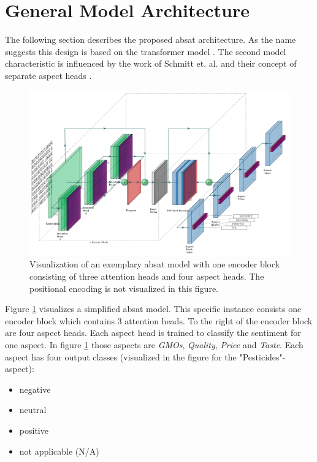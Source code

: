 \section{General Model Architecture}

The following section describes the proposed \acrfull{absat} architecture. As the name suggests this design is based on the transformer model \cite{Vaswani2017}. The second model characteristic is influenced by the work of Schmitt et. al. and their concept of separate aspect heads \cite{Schmitt2018}.
\bigskip

\begin{figure}[htp]
	\centering
	\includegraphics[width=\textwidth]{figures/04_method/04_t-absa}
	\caption{Visualization of an exemplary \acrfull{absat} model with one encoder block consisting of three attention heads and four aspect heads. The positional encoding is not visualized in this figure.}
	\label{fig:04_t-absa}
\end{figure}

Figure \ref{fig:04_t-absa} visualizes a simplified \gls{absat} model. This specific instance consists one encoder block which contains 3 attention heads. To the right of the encoder block are four aspect heads. Each aspect head is trained to classify the sentiment for one aspect. In figure \ref{fig:04_t-absa} those aspects are \textit{GMOs}, \textit{Quality}, \textit{Price} and \textit{Taste}. Each aspect has four output classes {(visualized in the figure for the "Pesticides"-aspect)}:

\begin{itemize}
	\item negative
	\item neutral
	\item positive
	\item not applicable {(N/A)}
\end{itemize}

